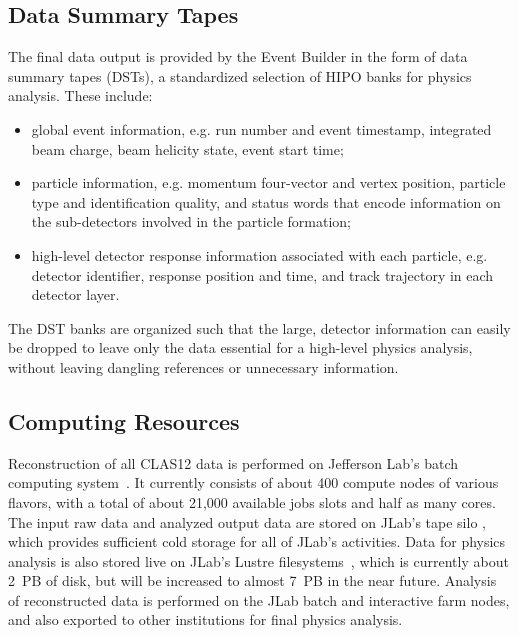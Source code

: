 \subsection{Data Summary Tapes}
\label{sec:dsts}

The final data output is provided by the Event Builder in the form of data summary tapes (DSTs), a standardized
selection of HIPO banks for physics analysis. These include:

\begin{itemize}
\item global event information, e.g. run number and event timestamp, integrated beam charge, beam helicity state,
  event start time;
\item particle information, e.g. momentum four-vector and vertex position, particle type and identification quality,
  and status words that encode information on the sub-detectors involved in the particle formation;
\item high-level detector response information associated with each particle, e.g. detector identifier, response
  position and time, and track trajectory in each detector layer.
\end{itemize}

\noindent
The DST banks are organized such that the large, detector information can easily be dropped to leave only the data
essential for a high-level physics analysis, without leaving dangling references or unnecessary information.

\subsection{Computing Resources}

Reconstruction of all CLAS12 data is performed on Jefferson Lab's batch computing system~\cite{jlab-batch-farm}.
It currently consists of about 400 compute nodes of various flavors, with a total of about 21,000 available jobs
slots and half as many cores.  The input raw data and analyzed output data are stored on JLab's tape silo
\cite{jlab-tape-silo}, which provides sufficient cold storage for all of JLab's activities.  Data for physics analysis is
also stored live on JLab's Lustre filesystems~\cite{jlab-lustre}, which is currently about 2~PB of disk, but will be
increased to almost 7~PB in the near future. Analysis of reconstructed data is performed on the JLab batch and
interactive farm nodes, and also exported to other institutions for final physics analysis.
